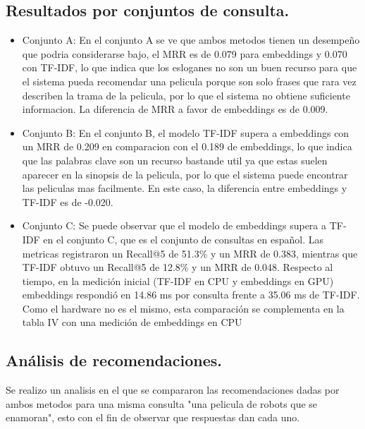 \subsection{Resultados por conjuntos de consulta.}
\begin{itemize}
    \item Conjunto A: En el conjunto A se ve que ambos metodos tienen un desempeño que podria considerarse bajo, el MRR es de 0.079 para embeddings y 0.070 con TF-IDF, lo que indica que los esloganes no son un buen recurso para que el sistema pueda recomendar una pelicula porque son solo frases que rara vez describen la trama de la pelicula, por lo que el sistema no obtiene suficiente informacion. La diferencia de MRR a favor de embeddings es de 0.009.
    \item Conjunto B: En el conjunto B, el modelo TF-IDF supera a embeddings con un MRR de 0.209 en comparacion con el 0.189 de embeddings, lo que indica que las palabras clave son un recurso bastande util ya que estas suelen aparecer en la sinopsis de la pelicula, por lo que el sistema puede encontrar las peliculas mas facilmente. En este caso, la diferencia entre embeddings y TF-IDF es de -0.020.
    \item Conjunto C: Se puede observar que el modelo de embeddings supera a TF-IDF en el conjunto C, que es el conjunto de consultas en español. Las metricas registraron un Recall@5 de 51.3\% y un MRR de 0.383, mientras que TF-IDF obtuvo un Recall@5 de 12.8\% y un MRR de 0.048. Respecto al tiempo, en la medición inicial (TF-IDF en CPU y embeddings en GPU) embeddings respondió en 14.86 ms por consulta frente a 35.06 ms de TF-IDF. Como el hardware no es el mismo, esta comparación se complementa en la tabla IV con una medición de embeddings en CPU
\end{itemize}


\subsection{Análisis de recomendaciones.}

Se realizo un analisis en el que se compararon las recomendaciones dadas por ambos metodos para una misma consulta "una pelicula de robots que se enamoran", esto con el fin de observar que respuestas dan cada uno.

